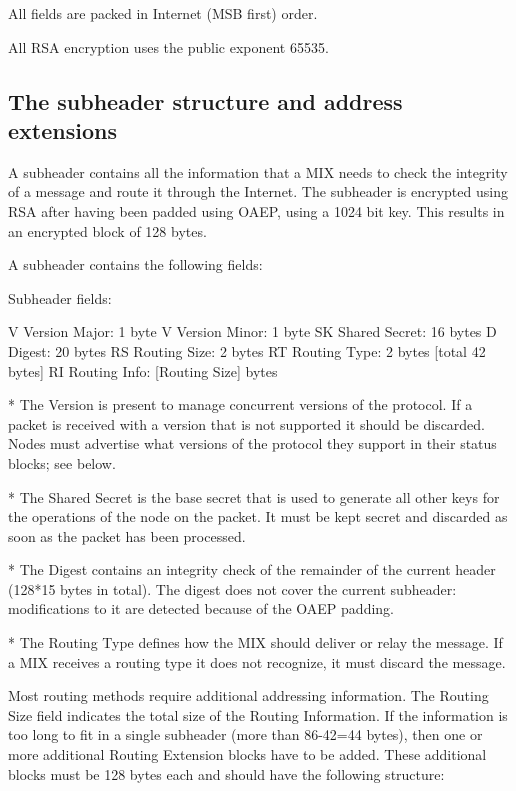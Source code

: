 All fields are packed in Internet (MSB first) order.

All RSA encryption uses the public exponent 65535.

\subsection{The subheader structure and address extensions}

A subheader contains all the information that a MIX needs to check the
integrity of a message and route it through the Internet. The subheader
is encrypted using RSA after having been padded using OAEP, using a 1024
bit key. This results in an encrypted block of 128 bytes.

A subheader contains the following fields:

Subheader fields:

V   Version Major:   1 byte
V   Version Minor:   1 byte
SK  Shared Secret:   16 bytes
D   Digest:          20 bytes
RS  Routing Size:    2 bytes 
RT  Routing Type:    2 bytes [total 42 bytes]
RI  Routing Info:    [Routing Size] bytes

* The Version is present to manage concurrent versions of the
protocol. If a packet is received with a version that is not supported
it should be discarded. Nodes must advertise what versions of the
protocol they support in their status blocks; see below.

* The Shared Secret is the base secret that is used to generate all
other keys for the operations of the node on the packet. It must be
kept secret and discarded as soon as the packet has been processed. 

* The Digest contains an integrity check of the remainder of the current
header (128*15 bytes in total). The digest does not cover the current
subheader: modifications to it are detected because of the OAEP padding.

* The Routing Type defines how the MIX should deliver or relay the
  message. If a MIX receives a routing type it does not recognize,
  it must discard the message.

  Most routing methods require additional addressing information.
  The Routing Size field indicates the total size of the Routing
  Information. If the information is too long to fit in a single
  subheader (more than 86-42=44 bytes), then one or more additional
  Routing Extension blocks have to be added. These additional blocks
  must be 128 bytes each and should have the following structure:
 
